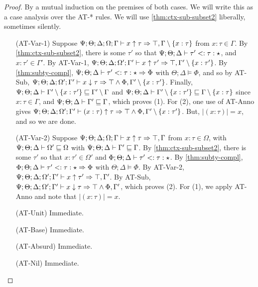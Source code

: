 \begin{proof}
By a mutual induction on the premises of both cases. We will write this as a case analysis over the AT-* rules.
We will use \autoref{thm:ctx-sub-subset2} liberally, sometimes silently.
\begin{itemize}
  \item[(AT-Var-1)] Suppose $\Psi ; \Theta ; \Delta; \Omega ; \Gamma \vdash x \uparrow \tau \Rightarrow \top, \Gamma \setminus \{x : \tau\}$ from $x : \tau \in \Gamma$.
  By \autoref{thm:ctx-sub-subset2}, there is some $\tau'$ so that $\Psi ; \Theta ; \Delta \vdash \tau' <: \tau : \star$, and $x : \tau' \in \Gamma'$.
  By AT-Var-1, $\Psi ; \Theta ; \Delta; \Omega' ; \Gamma' \vdash x \uparrow \tau' \Rightarrow \top, \Gamma' \setminus \{x : \tau'\}$.
  By \autoref{thm:subty-compl},  $\Psi ; \Theta ; \Delta \vdash \tau' <: \tau : \star \Rightarrow \Phi$ with $\Theta ; \Delta \vDash \Phi$, and so by AT-Sub,
  $\Psi ; \Theta ; \Delta; \Omega' ; \Gamma' \vdash x \downarrow \tau \Rightarrow \top \wedge \Phi, \Gamma' \setminus \{x : \tau'\}$. Finally, $\Psi ; \Theta ; \Delta \vdash \Gamma' \setminus \{x : \tau'\} \sqsubseteq \Gamma' \setminus \Gamma$ and $\Psi ; \Theta ; \Delta \vdash \Gamma' \setminus \{x : \tau'\} \sqsubseteq \Gamma \setminus \{x : \tau\}$ since $x : \tau \in \Gamma$, and $\Psi ; \Theta ; \Delta \vdash \Gamma' \sqsubseteq \Gamma$, which proves (1). For (2), one use of AT-Anno gives $\Psi ; \Theta ; \Delta; \Omega' ; \Gamma' \vdash (x : \tau) \uparrow \tau \Rightarrow \top \wedge \Phi, \Gamma' \setminus \{x : \tau'\}$. But, $|(x : \tau)| = x$, and so we are done.
  
  \item[(AT-Var-2)] Suppose $\Psi ; \Theta ; \Delta ; \Omega ; \Gamma\vdash x \uparrow \tau \Rightarrow \top, \Gamma$ from $x : \tau \in \Omega$, with $\Psi ; \Theta ; \Delta \vdash \Omega' \sqsubseteq \Omega$ with $\Psi ; \Theta ; \Delta \vdash \Gamma' \sqsubseteq \Gamma$. By \autoref{thm:ctx-sub-subset2}, there is some $\tau'$ so that $x : \tau' \in \Omega'$ and $\Phi ; \Theta ; \Delta \vdash \tau' <: \tau : \star$. By \autoref{thm:subty-compl}, $\Phi ; \Theta ; \Delta \vdash \tau' <: \tau : \star \Rightarrow \Phi$ with $\Theta ; \Delta \vDash \Phi$. 
  By AT-Var-2, $\Psi ; \Theta ; \Delta ; \Omega' ; \Gamma' \vdash x \uparrow \tau' \Rightarrow \top, \Gamma'$. By AT-Sub, 
  $\Psi ; \Theta ; \Delta ; \Omega' ; \Gamma' \vdash x \downarrow \tau \Rightarrow \top \wedge \Phi, \Gamma'$, which proves (2). For (1), we apply AT-Anno and note that $|(x : \tau)| = x$.
  
  \item[(AT-Unit)] Immediate.
  \item[(AT-Base)] Immediate.
  \item[(AT-Absurd)] Immediate.
  \item[(AT-Nil)] Immediate.
  

\end{itemize}
\end{proof}
